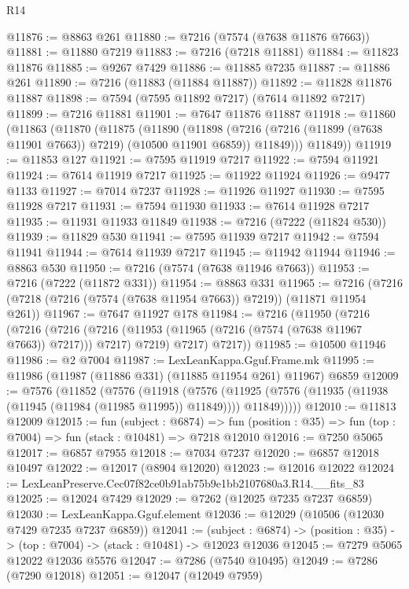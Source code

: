 \begin{lexlean}{R14}
\begin{coremodule}
@11876 := @8863 @261
@11880 := @7216 (@7574 (@7638 @11876 @7663))
@11881 := @11880 @7219
@11883 := @7216 (@7218 @11881)
@11884 := @11823 @11876
@11885 := @9267 @7429
@11886 := @11885 @7235
@11887 := @11886 @261
@11890 := @7216 (@11883 (@11884 @11887))
@11892 := @11828 @11876 @11887
@11898 := @7594 (@7595 @11892 @7217) (@7614 @11892 @7217)
@11899 := @7216 @11881
@11901 := @7647 @11876 @11887
@11918 := @11860
    (@11863
      (@11870
        (@11875
          (@11890
            (@11898
              (@7216 (@7216 (@11899 (@7638 @11901 @7663)) @7219) (@10500 @11901 @6859))
              @11849)))
        @11849))
@11919 := @11853 @127
@11921 := @7595 @11919 @7217
@11922 := @7594 @11921
@11924 := @7614 @11919 @7217
@11925 := @11922 @11924
@11926 := @9477 @1133
@11927 := @7014 @7237
@11928 := @11926 @11927
@11930 := @7595 @11928 @7217
@11931 := @7594 @11930
@11933 := @7614 @11928 @7217
@11935 := @11931 @11933 @11849
@11938 := @7216 (@7222 (@11824 @530))
@11939 := @11829 @530
@11941 := @7595 @11939 @7217
@11942 := @7594 @11941
@11944 := @7614 @11939 @7217
@11945 := @11942 @11944
@11946 := @8863 @530
@11950 := @7216 (@7574 (@7638 @11946 @7663))
@11953 := @7216 (@7222 (@11872 @331))
@11954 := @8863 @331
@11965 := @7216 (@7216 (@7218 (@7216 (@7574 (@7638 @11954 @7663)) @7219)) (@11871 @11954 @261))
@11967 := @7647 @11927 @178
@11984 := @7216
    (@11950
      (@7216
        (@7216
          (@7216 (@7216 (@11953 (@11965 (@7216 (@7574 (@7638 @11967 @7663)) @7217))) @7217) @7219)
          @7217)
        @7217))
@11985 := @10500 @11946
@11986 := @2 @7004
@11987 := LexLeanKappa.Gguf.Frame.mk
@11995 := @11986 (@11987 (@11886 @331) (@11885 @11954 @261) @11967) @6859
@12009 := @7576
    (@11852
      (@7576
        (@11918
          (@7576
            (@11925 (@7576 (@11935 (@11938 (@11945 (@11984 (@11985 @11995)) @11849)))) @11849)))))
@12010 := @11813 @12009
@12015 := fun (subject : @6874) =>
  fun (position : @35) => fun (top : @7004) => fun (stack : @10481) => @7218 @12010
@12016 := @7250 @5065
@12017 := @6857 @7955
@12018 := @7034 @7237
@12020 := @6857 @12018 @10497
@12022 := @12017 (@8904 @12020)
@12023 := @12016 @12022
@12024 := LexLeanPreserve.Cec07f82ce0b91ab75b9e1bb2107680a3.R14.__fits_83
@12025 := @12024 @7429
@12029 := @7262 (@12025 @7235 @7237 @6859)
@12030 := LexLeanKappa.Gguf.element
@12036 := @12029 (@10506 (@12030 @7429 @7235 @7237 @6859))
@12041 := (subject : @6874) ->
  (position : @35) -> (top : @7004) -> (stack : @10481) -> @12023 @12036
@12045 := @7279 @5065 @12022 @12036 @5576
@12047 := @7286 (@7540 @10495)
@12049 := @7286 (@7290 @12018)
@12051 := @12047 (@12049 @7959)

\end{coremodule}
\end{lexlean}
